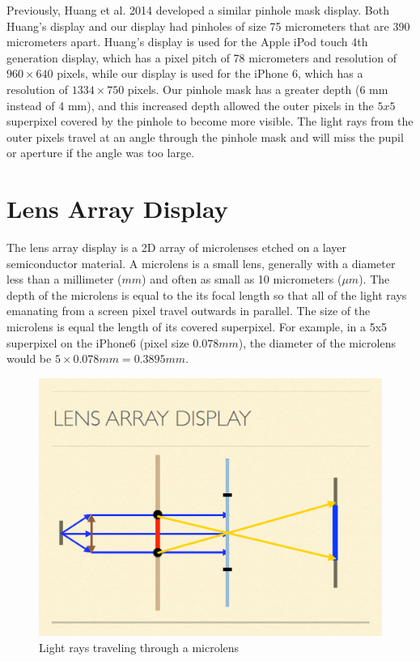 Previously, Huang et al. 2014 \cite{Huang:2014:VisionCorrectingDisplay} developed a similar pinhole mask display. Both Huang's display and our display had pinholes of size 75 micrometers that are 390 micrometers apart. Huang's display is used for the Apple iPod touch 4th generation display, which has a pixel pitch of 78 micrometers and resolution of $960 \times 640$ pixels, while our display is used for the iPhone 6, which has a resolution of $1334 \times 750$ pixels. Our pinhole mask has a greater depth (6 mm instead of 4 mm), and this increased depth allowed the outer pixels in the $5x5$ superpixel covered by the pinhole to become more visible. The light rays from the outer pixels travel at an angle through the pinhole mask and will miss the pupil or aperture if the angle was too large.


\section{Lens Array Display}

The lens array display is a 2D array of microlenses etched on a layer semiconductor material. A microlens is a small lens, generally with a diameter less than a millimeter ($mm$) and often as small as 10 micrometers ($\mu m$). The depth of the microlens is equal to the its focal length so that all of the light rays emanating from a screen pixel travel outwards in parallel. The size of the microlens is equal the length of its covered superpixel. For example, in a 5x5 superpixel on the iPhone6 (pixel size $0.078 mm$), the diameter of the microlens would be $5 \times 0.078mm = 0.3895mm$.  

\begin{figure}[ht!]
  \centering
  \includegraphics[width=5.0in]{chapters/chapter3/images/lens_rays.png}
  \caption{Light rays traveling through a microlens \cite{Wu:EECS-2016-67}}
  \label{fig:lens}
\end{figure}


